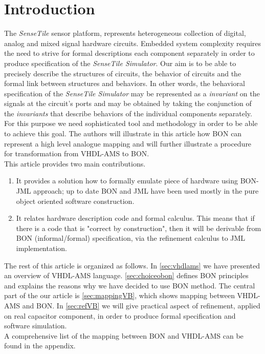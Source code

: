 \documentclass{article}
\newcommand{\ST}{\emph{SenseTile}\xspace}
\newcommand{\STS}{\emph{SenseTile Simulator}\xspace}
\newcommand{\inv}{\emph{invariant}\xspace}
\begin{document}
\section{Introduction}
\label{sec:introduction}
The \ST sensor platform, represents heterogeneous collection of digital, analog
and mixed signal hardware circuits. Embedded system complexity
requires the need to strive for formal descriptions each component
separately in order to produce specification of the \STS.
Our aim is to be able to precisely describe the structures of circuits,
the behavior of circuits and the formal link between structures and behaviors.
In other words, the behavioral specification of the \STS may be
represented as a \inv on the signals at the circuit's ports and may be obtained
by taking the conjunction of the \emph{invariants} that describe
behaviors of the individual components separately.
For this purpose we need  sophisticated tool and methodology
in order to be able to achieve this goal. 
The authors will illustrate in this article how BON can represent a high
level analogue mapping and will further illustrate a procedure for
transformation from VHDL-AMS to BON.\\
This article provides two main contributions.
\begin{enumerate}
\item
 It provides a solution how to formally emulate
 piece of hardware using BON-JML approach; up to date BON and JML
 have been used mostly in the pure object oriented software construction.   
\item
It relates hardware description code and formal calculus.
This means that if there  is a code that is "correct by construction",
then it will be derivable from BON (informal/formal) specification,
via the refinement calculus to JML implementation.    
\end{enumerate}
The rest of this article is organized as follows.
In \autoref{sec:vhdlams} we have  presented an overview of VHDL-AMS language.
\autoref{sec:choiceobon} defines  BON principles and explains the
reasons why we have decided to use BON method.
The central part of the our article is \autoref{sec:mappingVB}, which
shows mapping between VHDL-AMS and BON.
In \autoref{sec:refVB} we will give practical aspect of refinement,
applied on real capacitor component, in order to produce formal specification 
and software simulation.\\ 
A comprehensive list of the mapping between BON and VHDL-AMS can be
found in the appendix.
\end{document}

